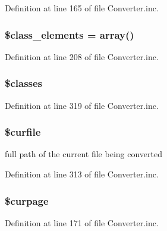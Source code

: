 \-Definition at line 165 of file \-Converter.\-inc.

\hypertarget{class_converter_a82c1ed609548471e99d13d57cefef0bf}{
\subsubsection[{\$class\-\_\-elements}]{\setlength{\rightskip}{0pt plus 5cm}\$class\-\_\-elements = array()}}\label{class_converter_a82c1ed609548471e99d13d57cefef0bf}


\-Definition at line 208 of file \-Converter.\-inc.

\hypertarget{class_converter_a4212f1eca3e4faf764728d56bc13dfd3}{
\subsubsection[{\$classes}]{\setlength{\rightskip}{0pt plus 5cm}\$classes}}\label{class_converter_a4212f1eca3e4faf764728d56bc13dfd3}


\-Definition at line 319 of file \-Converter.\-inc.

\hypertarget{class_converter_a84352b4d740a45279b61228864b9b5e7}{
\subsubsection[{\$curfile}]{\setlength{\rightskip}{0pt plus 5cm}\$curfile}}\label{class_converter_a84352b4d740a45279b61228864b9b5e7}
full path of the current file being converted 

\-Definition at line 313 of file \-Converter.\-inc.

\hypertarget{class_converter_a3953bad97628e903e2f403e75f3ce43b}{
\subsubsection[{\$curpage}]{\setlength{\rightskip}{0pt plus 5cm}\$curpage}}\label{class_converter_a3953bad97628e903e2f403e75f3ce43b}


\-Definition at line 171 of file \-Converter.\-inc.


